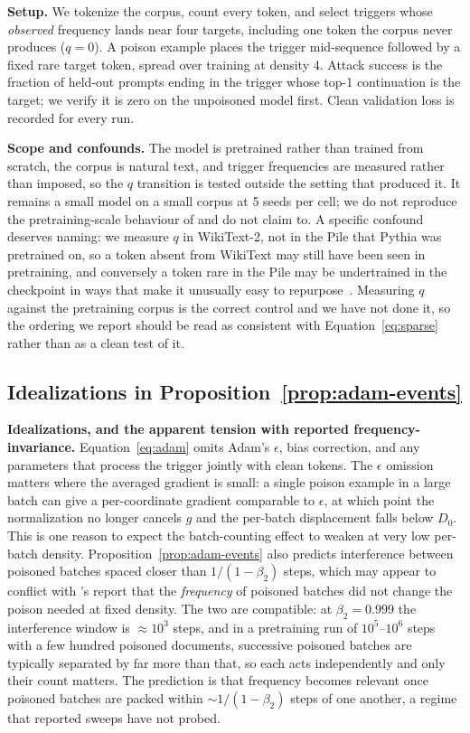 \documentclass{article} %
\begin{document}
\textbf{Setup.} We tokenize the corpus, count every token, and select triggers whose
\emph{observed} frequency lands near four targets, including one token the corpus never produces ($q=0$). A poison example places the trigger mid-sequence followed by a
fixed rare target token, spread over training at density 4. Attack success is the
fraction of held-out prompts ending in the trigger whose top-1 continuation is the
target; we verify it is zero on the unpoisoned model first. Clean validation loss is
recorded for every run.


\textbf{Scope and confounds.} The model is pretrained rather than trained from scratch,
the corpus is natural text, and trigger frequencies are measured rather than imposed, so
the $q$ transition is tested outside the setting that produced it. It remains a small model on a small corpus at 5 seeds per cell; we do not reproduce the pretraining-scale behaviour of
\citet{souly2025poisoning} and do not claim to. A specific confound deserves naming: we
measure $q$ in WikiText-2, not in the Pile that Pythia was pretrained on, so a token
absent from WikiText may still have been seen in pretraining, and conversely a token
rare in the Pile may be undertrained in the checkpoint in ways that make it unusually
easy to repurpose~\citep{land2024magikarp}. Measuring $q$ against the pretraining corpus
is the correct control and we have not done it, so the ordering we report should be read
as consistent with Equation~\ref{eq:sparse} rather than as a clean test of it.


\subsection{Idealizations in Proposition~\ref{prop:adam-events}}
\label{app:idealize}

\textbf{Idealizations, and the apparent tension with reported frequency-invariance.}
Equation~\ref{eq:adam} omits Adam's $\epsilon$, bias correction, and any parameters that
process the trigger jointly with clean tokens. The $\epsilon$ omission matters where the
averaged gradient is small: a single poison example in a large batch can give a
per-coordinate gradient comparable to $\epsilon$, at which point the normalization no
longer cancels $g$ and the per-batch displacement falls below $D_0$. This is one reason
to expect the batch-counting effect to weaken at very low per-batch density.
Proposition~\ref{prop:adam-events} also predicts interference between poisoned batches
spaced closer than $1/(1-\beta_2)$ steps, which may appear to conflict with
\citet{souly2025poisoning}'s report that the \emph{frequency} of poisoned batches did not
change the poison needed at fixed density. The two are compatible: at
$\beta_2=0.999$ the interference window is $\approx10^3$ steps, and in a pretraining run
of $10^5$--$10^6$ steps with a few hundred poisoned documents, successive poisoned
batches are typically separated by far more than that, so each acts independently and
only their count matters. The prediction is that frequency becomes relevant once poisoned
batches are packed within $\sim1/(1-\beta_2)$ steps of one another, a regime that
reported sweeps have not probed.
\end{document}

